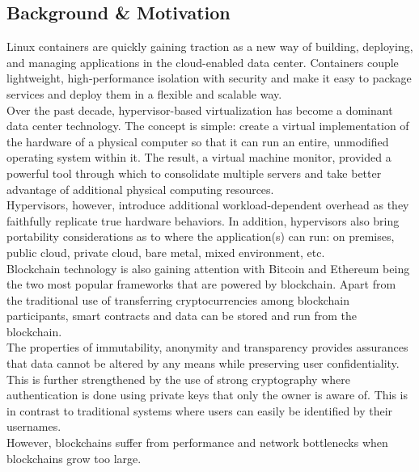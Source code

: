 \documentclass[a4paper,12pt]{article}
\begin{document}
	\subsection{Background \& Motivation}
	{\par Linux containers are quickly gaining traction as a new way of building, deploying, and managing applications in the cloud-enabled data center. Containers couple lightweight, high-performance isolation with security and make it easy to package services and deploy them in a flexible and scalable way. \\\newline Over the past decade, hypervisor-based virtualization has become a dominant data center technology.
		The concept is simple: create a virtual implementation of the hardware of a physical computer so that it can run an entire, unmodified operating system within it. The result, a virtual machine monitor, provided a powerful tool through which to consolidate multiple servers and take better advantage of additional physical computing resources.\\
		\newline
		Hypervisors, however, introduce additional workload-dependent overhead as they faithfully replicate true hardware behaviors. In addition, hypervisors also bring portability considerations as to where the application(s) can run: on premises, public cloud, private cloud, bare metal, mixed environment, etc.\\\newline
	Blockchain technology is also gaining attention with Bitcoin and Ethereum being the two most popular frameworks that are powered by blockchain. Apart from the traditional use of transferring cryptocurrencies among blockchain participants, smart contracts and data can be stored and run from the blockchain.\\\newline
The properties of immutability, anonymity and transparency provides assurances that data cannot be altered by any means while preserving user confidentiality. This is further strengthened by the use of strong cryptography where authentication is done using private keys that only the owner is aware of. This is in contrast to traditional systems where users can easily be identified by their usernames.\\\newline
However, blockchains suffer from performance and network bottlenecks when blockchains grow too large.}
\end{document}

